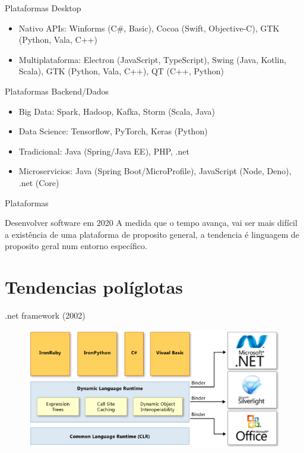 \documentclass[aspectratio=169]{beamer}
\begin{document}
\begin{frame}{Plataformas}
    Desktop
	\begin{itemize}
	\item Nativo APIs: Winforms (C\#, Basic), Cocoa (Swift, Objective-C), GTK (Python, Vala, C++)
    \item Multiplataforma: Electron (JavaScript, TypeScript), Swing (Java, Kotlin, Scala), GTK (Python, Vala, C++), QT (C++, Python)
	\end{itemize}
\end{frame}



\begin{frame}{Plataformas}
    Backend/Dados
	\begin{itemize}
	\item Big Data: Spark, Hadoop, Kafka, Storm (Scala, Java)
    \item Data Science: Tensorflow, PyTorch, Keras (Python)
    \item Tradicional: Java (Spring/Java EE), PHP, .net
    \item Microservicios: Java (Spring Boot/MicroProfile), JavaScript (Node, Deno), .net (Core)

	\end{itemize}
\end{frame}

\begin{frame}{Plataformas}

	\begin{alertblock}{Desenvolver software em 2020}
    A medida que o tempo avança, vai ser mais difícil a existência de uma plataforma de proposito general, a tendencia é linguagem de proposito geral num entorno específico.
	\end{alertblock}
\end{frame}


\section{Tendencias políglotas}

\begin{frame}{.net framework (2002)}

	\begin{figure}
    			\centering
    			\includegraphics[width=\linewidth]{Images/netpoly}
    			\end{figure}

\end{frame}
\end{document}

